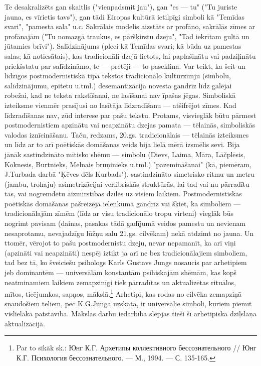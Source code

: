 \documentclass[11pt]{article}
\begin{document}
Te desakralizēts gan skaitlis ("vienpadsmit jau"),
gan "es --- tu" ("Tu juriste jauna, es vīrietis tavs"),
gan tādi Eiropas kultūrā ietilpīgi simboli kā
"Temīdas svari", "pamesta sala" u.c.
Sakrālais modelis aizstāts ar profāno, sakrālās
zīmes ar profānajām ("Tu nomazgā traukus, es
pāršķirstu dzeju", "Tad iekrītam gultā un jūtamies brīvi").
Salīdzinājums (pleci kā Temīdas svari; kā būda uz
pamestas salas; kā notiesātais), kas tradicionāli
dzejā lietots, lai paplašinātu vai padziļinātu
priekšstatu par salīdzināmo, te --- pretēji --- to
paseklina. Var teikt, ka šeit un līdzīgos postmodernistiskā
tipa tekstos tradicionālo kultūrzīmju (simbolu,
salīdzinājumu, epitetu u.tml.) desemantizācija
novesta gandrīz līdz galējai robežai, kad ne teksta rakstīšanai,
ne lasīšanai nav īpašas jēgas. Simboliskā izteiksme
vienmēr prasījusi no lasītāja līdzradīšanu --- atšifrējot
zīmes. Kad līdzradīšanas nav, zūd interese par pašu tekstu.
Protams, visvieglāk būtu pārmest postmodernistiem
apzinātu vai neapzinātu dzejas pamata --- tēlainās,
simboliskās valodas iznīcināšanu. Taču, redzams,
20.gs. tradicionālais --- tēlainās izteiksmes un līdz
ar to arī poētiskās domāšanas veids bija lielā mērā izsmēlis
sevi. Bija jānāk sastindzināto mītisko shēmu --- simbolu
(Dievs, Laima, Māra, Lāčplēsis, Koknesis, Burtnieks,
Melnais bruņinieks u.tml.) "pazemināšanai"
(kā, piemēram, J.Turbada darbā "Ķēves dēls Kurbads"),
sastindzināto simetrisko ritmu un metru
(jambu, trohaju) asimetrizācijai verlibriskās
struktūrās, lai tad vai nu pārradītu tās,
vai nogremdētu aizmirstības dzīlēs uz visiem laikiem.
Postmodernistiskās poētiskās domāšanas pašreizējā
ielenkumā gandrīz vai šķiet, ka simboliem ---
tradicionālajām zīmēm (līdz ar visu tradicionālo
tropu virteni) vieglāk būs nogrimt pavisam
(dainas, pasakas tādā gadījumā veidos pamestu un
nevienam nesaprotamu, nevajadzīgu lūžņu salu
21.gs. cilvēkam) nekā atdzimt no jauna.
Un ttomēr, vērojot to pašu postmodernistu dzeju,
nevar nepamanīt, ka arī viņi (apzināti vai neapzināti)
nespēj iztikt ja arī ne bez tradicionālajiem simboliem,
tad bez tā, ko šveiciešu psihologs Karls Gustavs Jungs
nosaucis par arhetipiem jeb dominantēm --- universālām
konstantām psihiskajām shēmām, kas kopš
neatminamiem laikiem zemapzinīgi tiek pārradītas un
aktualizētas rituālos, mītos, ticējumkos, sapņos,
mākslā.\footnote{Par to sīkāk sk.: Юнг К.Г.
Архетипы коллективного бессознательного //
Юнг К.Г. Психология бессознательного. --- М.,
1994. --- С. 135-165.}
Arhetipi, kas rodas no cilvēka zemapziņā snaudošiem
tēliem, pēc K.G.Junga uzskata, ir universālie
simboli, kuriem piemīt vislielākā patstāvība.
Mākslas darbu iedarbība slēpjas tieši šī arhetipiskā
dziļslāņa aktualizācijā.
\end{document}
